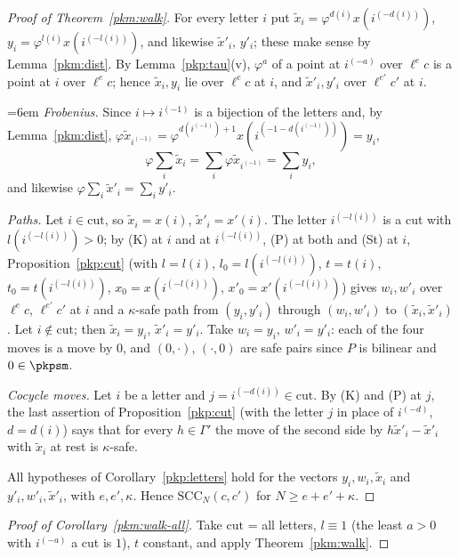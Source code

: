\documentclass[10pt]{amsart}
\theoremstyle{definition}
\theoremstyle{remark}
\begin{document}
\begin{proof}[Proof of Theorem~\ref{pkm:walk}]
For every letter $i$ put $\tilde x_i=\varphi^{d(i)}x(i^{(-d(i))})$, $y_i=\varphi^{l(i)}x(i^{(-l(i))})$,
and likewise $\tilde x'_i$, $y'_i$; these make sense by Lemma~\ref{pkm:dist}. By
Lemma~\ref{pkp:tau}(v), $\varphi^a$ of a point at $i^{(-a)}$ over $\ell^ec$ is a point at $i$ over
$\ell^ec$; hence $\tilde x_i,y_i$ lie over $\ell^ec$ at $i$, and $\tilde x'_i,y'_i$ over $\ell^{e'}c'$
at $i$.

{\emergencystretch=6em \emph{Frobenius.} Since $i\mapsto i^{(-1)}$ is a bijection of the letters and, by
Lemma~\ref{pkm:dist}, $\varphi\tilde x_{i^{(-1)}}=\varphi^{d(i^{(-1)})+1}x(i^{(-1-d(i^{(-1)}))})=y_i$,
\[
\varphi\sum_i\tilde x_i=\sum_i\varphi\tilde x_{i^{(-1)}}=\sum_iy_i,
\]
and likewise $\varphi\sum_i\tilde x'_i=\sum_iy'_i$.\par}

\emph{Paths.} Let $i\in\mathrm{cut}$, so $\tilde x_i=x(i)$, $\tilde x'_i=x'(i)$. The letter
$i^{(-l(i))}$ is a cut with $l(i^{(-l(i))})>0$; by (K) at $i$ and at $i^{(-l(i))}$, (P) at both and
(St) at $i$, Proposition~\ref{pkp:cut} (with $l=l(i)$, $l_0=l(i^{(-l(i))})$, $t=t(i)$,
$t_0=t(i^{(-l(i))})$, $x_0=x(i^{(-l(i))})$, $x'_0=x'(i^{(-l(i))})$) gives $w_i,w'_i$ over $\ell^ec$,
$\ell^{e'}c'$ at $i$ and a $\kappa$-safe path from $(y_i,y'_i)$ through $(w_i,w'_i)$ to
$(\tilde x_i,\tilde x'_i)$. Let $i\notin\mathrm{cut}$; then $\tilde x_i=y_i$, $\tilde x'_i=y'_i$. Take
$w_i=y_i$, $w'_i=y'_i$: each of the four moves is a move by $0$, and $(0,\cdot)$, $(\cdot,0)$ are
safe pairs since $P$ is bilinear and $0\in\pkpsm$.

\emph{Cocycle moves.} Let $i$ be a letter and $j=i^{(-d(i))}\in\mathrm{cut}$. By (K) and (P) at $j$,
the last assertion of Proposition~\ref{pkp:cut} (with the letter $j$ in place of $i^{(-d)}$, $d=d(i)$)
says that for every $h\in\Gamma'$ the move of the second side by $h\tilde x'_i-\tilde x'_i$ with
$\tilde x_i$ at rest is $\kappa$-safe.

All hypotheses of Corollary~\ref{pkp:letters} hold for the vectors $y_i,w_i,\tilde x_i$ and
$y'_i,w'_i,\tilde x'_i$, with $e,e',\kappa$. Hence $\mathrm{SCC}_N(c,c')$ for $N\ge e+e'+\kappa$.
\end{proof}

\begin{proof}[Proof of Corollary~\ref{pkm:walk-all}]
Take $\mathrm{cut}$ = all letters, $l\equiv1$ (the least $a>0$ with $i^{(-a)}$ a cut is $1$), $t$
constant, and apply Theorem~\ref{pkm:walk}.
\end{proof}
\end{document}
